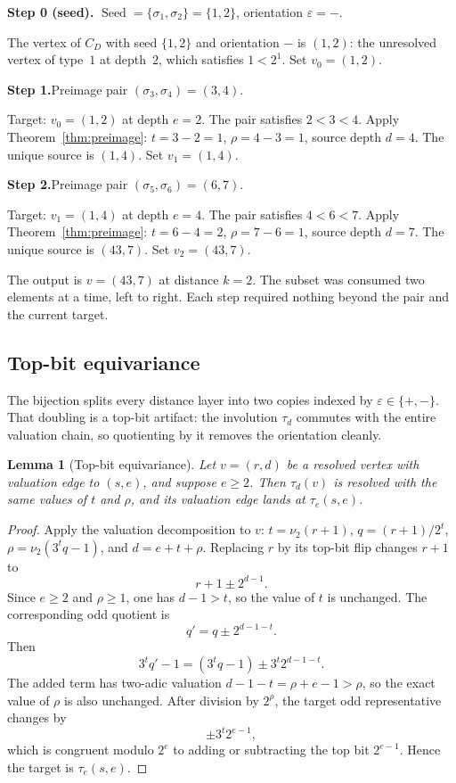 \documentclass[11pt]{amsart}
\newtheorem{lemma}[theorem]{Lemma}
\theoremstyle{definition}
\theoremstyle{remark}
\newcommand{\nuu}{\nu_2}
\newcommand{\Seed}{\operatorname{Seed}}
\newcommand{\eps}{\varepsilon}
\begin{document}
\textbf{Step 0 (seed).}\enspace
$\Seed=\{\sigma_1,\sigma_2\}=\{1,2\}$, orientation $\eps=-$.

The vertex of $C_D$ with seed $\{1,2\}$ and orientation $-$ is
$(1,2)$: the unresolved vertex of type~$1$ at depth~$2$, which
satisfies $1<2^1$.  Set $v_0=(1,2)$.

\textbf{Step 1.}\enspace Preimage pair
$(\sigma_3,\sigma_4)=(3,4)$.

Target: $v_0=(1,2)$ at depth $e=2$.  The pair satisfies $2<3<4$.
Apply Theorem~\ref{thm:preimage}: $t=3-2=1$, $\rho=4-3=1$, source
depth $d=4$.  The unique source is $(1,4)$.  Set $v_1=(1,4)$.

\textbf{Step 2.}\enspace Preimage pair
$(\sigma_5,\sigma_6)=(6,7)$.

Target: $v_1=(1,4)$ at depth $e=4$.  The pair satisfies $4<6<7$.
Apply Theorem~\ref{thm:preimage}: $t=6-4=2$, $\rho=7-6=1$, source
depth $d=7$.  The unique source is $(43,7)$.  Set $v_2=(43,7)$.

The output is $v=(43,7)$ at distance $k=2$.  The subset was consumed
two elements at a time, left to right.  Each step required nothing
beyond the pair and the current target.

\subsection{Top-bit equivariance}\label{subsec:topbit}

The bijection splits every distance layer into two copies indexed by
$\eps\in\{+,-\}$.  That doubling is a top-bit artifact: the
involution $\tau_d$ commutes with the entire valuation chain, so
quotienting by it removes the orientation cleanly.

\begin{lemma}[Top-bit equivariance]\label{lem:topbit}
Let $v=(r,d)$ be a resolved vertex with valuation edge to $(s,e)$,
and suppose $e\ge2$.  Then $\tau_d(v)$ is resolved with the same
values of $t$ and $\rho$, and its valuation edge lands at
$\tau_e(s,e)$.
\end{lemma}

\begin{proof}
Apply the valuation decomposition to $v$: $t=\nuu(r+1)$,
$q=(r+1)/2^t$, $\rho=\nuu(3^tq-1)$, and $d=e+t+\rho$.  Replacing
$r$ by its top-bit flip changes $r+1$ to
\[
r+1\pm2^{d-1}.
\]
Since $e\ge2$ and $\rho\ge1$, one has $d-1>t$, so the value of $t$
is unchanged.  The corresponding odd quotient is
\[
q'=q\pm2^{d-1-t}.
\]
Then
\[
3^tq'-1=(3^tq-1)\pm3^t2^{d-1-t}.
\]
The added term has two-adic valuation $d-1-t=\rho+e-1>\rho$, so the
exact value of $\rho$ is also unchanged.  After division by $2^\rho$,
the target odd representative changes by
\[
\pm 3^t2^{e-1},
\]
which is congruent modulo $2^e$ to adding or subtracting the top bit
$2^{e-1}$.  Hence the target is $\tau_e(s,e)$.
\end{proof}
\end{document}
